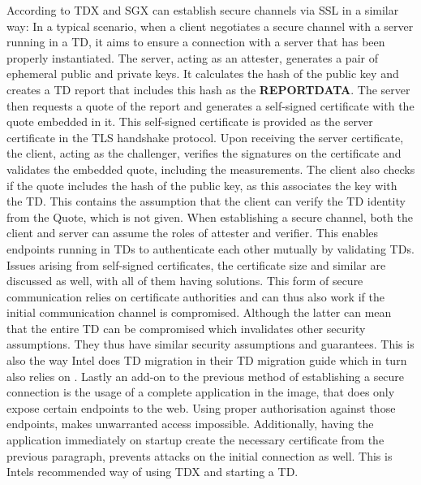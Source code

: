 
According to \cite{cheng_intel_2023} TDX and SGX can establish secure channels via SSL in a similar way:
In a typical scenario, when a client negotiates a secure channel with a server running in a TD, it aims to ensure a connection with a server that has been properly instantiated. The server, acting as an attester, generates a pair of ephemeral public and private keys. It calculates the hash of the public key and creates a TD report that includes this hash as the \textbf{REPORTDATA}. The server then requests a quote of the report and generates a self-signed certificate with the quote embedded in it. This self-signed certificate is provided as the server certificate in the TLS handshake protocol. Upon receiving the server certificate, the client, acting as the challenger, verifies the signatures on the certificate and validates the embedded quote, including the measurements. The client also checks if the quote includes the hash of the public key, as this associates the key with the TD. This contains the assumption that the client can verify the TD identity from the Quote, which is not given. When establishing a secure channel, both the client and server can assume the roles of attester and verifier. This enables endpoints running in TDs to authenticate each other mutually by validating TDs\cite{knauth_integrating_2019}. Issues arising from self-signed certificates, the certificate size and similar are discussed as well, with all of them  having solutions. This form of secure communication relies on certificate authorities and can thus also work if the initial communication channel is compromised. Although the latter can mean that the entire TD can be compromised which invalidates other security assumptions. They thus have similar security assumptions and guarantees. This is also the way Intel does TD migration in their  TD migration guide\cite{intel_corporation_td_migration_design_2023} which in turn also relies on \cite{knauth_integrating_2019}.
Lastly an add-on to the previous method of establishing a secure connection is the usage of a complete application in the image, that does only expose certain endpoints to the web. Using proper authorisation against those endpoints, makes unwarranted access impossible. Additionally, having the application immediately on startup create the necessary certificate from the previous paragraph, prevents attacks on the initial connection as well. This is Intels recommended way of using TDX and starting a TD. 

